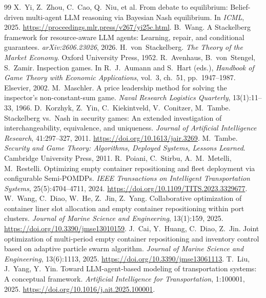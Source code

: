 \documentclass[a4paper,fleqn]{cas-sc}
\begin{document}
\begin{thebibliography}{99}
 X.~Yi, Z.~Zhou, C.~Cao, Q.~Niu, et al. From debate to equilibrium: Belief-driven multi-agent LLM reasoning via Bayesian Nash equilibrium. In \emph{ICML}, 2025. \url{https://proceedings.mlr.press/v267/yi25c.html}.
 B.~Wang. A Stackelberg framework for resource-aware LLM agents: Learning, repair, and conditional guarantees. \emph{arXiv:2606.23026}, 2026.
 H.~von~Stackelberg. \emph{The Theory of the Market Economy}. Oxford University Press, 1952.
 R.~Avenhaus, B.~von~Stengel, S.~Zamir. Inspection games. In R.~J.~Aumann and S.~Hart (eds.), \emph{Handbook of Game Theory with Economic Applications}, vol.~3, ch.~51, pp.~1947--1987. Elsevier, 2002.
 M.~Maschler. A price leadership method for solving the inspector's non-constant-sum game. \emph{Naval Research Logistics Quarterly}, 13(1):11--33, 1966.
 D.~Korzhyk, Z.~Yin, C.~Kiekintveld, V.~Conitzer, M.~Tambe. Stackelberg vs.\ Nash in security games: An extended investigation of interchangeability, equivalence, and uniqueness. \emph{Journal of Artificial Intelligence Research}, 41:297--327, 2011. \url{https://doi.org/10.1613/jair.3269}.
 M.~Tambe. \emph{Security and Game Theory: Algorithms, Deployed Systems, Lessons Learned}. Cambridge University Press, 2011.
 R.~Poiani, C.~Stirbu, A.~M.~Metelli, M.~Restelli. Optimizing empty container repositioning and fleet deployment via configurable Semi-POMDPs. \emph{IEEE Transactions on Intelligent Transportation Systems}, 25(5):4704--4711, 2024. \url{https://doi.org/10.1109/TITS.2023.3329677}.
 W.~Wang, C.~Diao, W.~He, Z.~Jin, Z.~Yang. Collaborative optimization of container liner slot allocation and empty container repositioning within port clusters. \emph{Journal of Marine Science and Engineering}, 13(1):159, 2025. \url{https://doi.org/10.3390/jmse13010159}.
 J.~Cai, Y.~Huang, C.~Diao, Z.~Jin. Joint optimization of multi-period empty container repositioning and inventory control based on adaptive particle swarm algorithm. \emph{Journal of Marine Science and Engineering}, 13(6):1113, 2025. \url{https://doi.org/10.3390/jmse13061113}.
 T.~Liu, J.~Yang, Y.~Yin. Toward LLM-agent-based modeling of transportation systems: A conceptual framework. \emph{Artificial Intelligence for Transportation}, 1:100001, 2025. \url{https://doi.org/10.1016/j.ait.2025.100001}.
\end{thebibliography}
\end{document}
